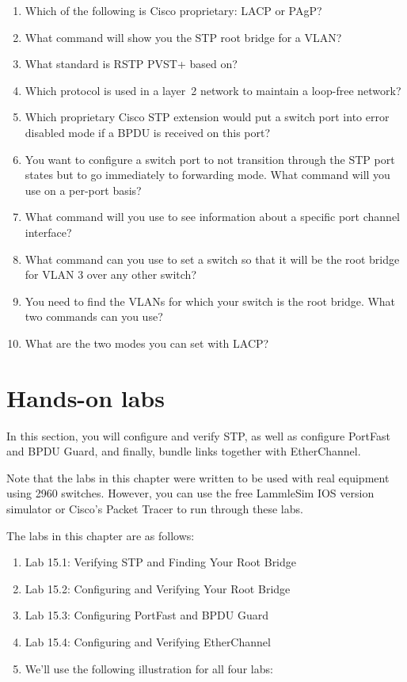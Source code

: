 \begin{enumerate}
\item
  Which of the following is Cisco proprietary: LACP or PAgP?
\item
  What command will show you the STP root bridge for a VLAN?
\item
  What standard is
  RSTP PVST+ based on?
\item
  Which protocol is used in a layer~2 network to maintain a loop-free
  network?
\item
  Which proprietary Cisco STP extension would put a switch port into
  error disabled mode if a BPDU is received on this port?
\item
  You want to configure a switch port to not transition through the STP
  port states but to go immediately to forwarding mode. What command
  will you use on a per-port basis?
\item
  What command will you use to see information about a specific port
  channel interface?
\item
  What command can you use to set a switch so that it will be the root
  bridge for VLAN 3 over any other switch?
\item
  You need to find the VLANs for which your switch is the root bridge.
  What two commands can you use?
\item
  What are the two modes you can set with LACP?
\end{enumerate}

\section{Hands-on labs}

In this section, you will configure and verify STP, as well as configure
PortFast and BPDU Guard, and finally, bundle links together with
EtherChannel.

Note that the labs in this chapter were written to be used with real
equipment using 2960 switches. However, you can use the free LammleSim
IOS version simulator or Cisco's Packet Tracer to run through these
labs.

The labs in this chapter are as follows:

\begin{enumerate}
\item
  Lab 15.1: Verifying STP and Finding Your Root Bridge
\item
  Lab 15.2: Configuring and Verifying Your Root Bridge
\item
  Lab 15.3: Configuring PortFast and BPDU Guard
\item
  Lab 15.4: Configuring and Verifying EtherChannel
\item
  We'll use the following illustration for all four labs:
\end{enumerate}

